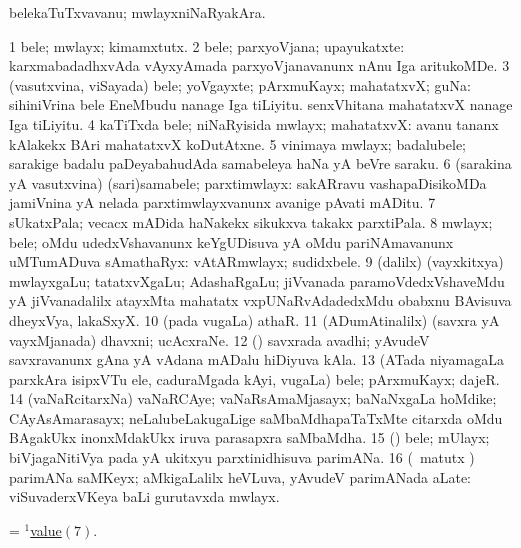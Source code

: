 \bentry
{} 
\gl{\nA}
\expl{}
\bmng
 belekaTuTxvavanu; mwlayxniNaRyakAra. 
\emng
\eentry

\bentry
{} 
\gl{\nA}
\expl{}
\bmng
\bnum
\num{1} bele; mwlayx; kimamxtutx. 
\num{2} bele; parxyoVjana; upayukatxte:  karxmabadadhxvAda vAyxyAmada parxyoVjanavanunx nAnu Iga aritukoMDe. 
\num{3} (vasutxvina, viSayada) bele; yoVgayxte; pArxmuKayx; mahatatxvX; guNa:  sihiniVrina bele EneMbudu nanage Iga tiLiyitu.  senxVhitana mahatatxvX nanage Iga tiLiyitu. 
\num{4} kaTiTxda bele; niNaRyisida mwlayx; mahatatxvX:  avanu tananx kAlakekx BAri mahatatxvX koDutAtxne. 
\num{5} vinimaya mwlayx; badalubele; sarakige badalu paDeyabahudAda samabeleya haNa yA beVre saraku. 
\num{6} (sarakina yA vasutxvina) (sari)samabele; parxtimwlayx:  sakARravu vashapaDisikoMDa jamiVnina yA nelada parxtimwlayxvanunx avanige pAvati mADitu. 
\hypertarget{value(1)7}{} 
\num{7} sUkatxPala; vecacx mADida haNakekx sikukxva takakx parxtiPala. 
\num{8} mwlayx; bele; oMdu udedxVshavanunx keYgUDisuva yA oMdu pariNAmavanunx uMTumADuva sAmathaRyx:  vAtARmwlayx; sudidxbele. 
\num{9} (\bava dalilx) (vayxkitxya) mwlayxgaLu; tatatxvXgaLu; AdashaRgaLu; jiVvanada paramoVdedxVshaveMdu yA jiVvanadalilx atayxMta mahatatx vxpUNaRvAdadedxMdu obabxnu BAvisuva dheyxVya, lakaSxyX. 
\num{10} (pada \mo vugaLa) athaR. 
\num{11} (ADumAtinalilx) (savxra yA vayxMjanada) dhavxni; ucAcxraNe. 
\num{12} (\saM) savxrada avadhi; yAvudeV savxravanunx gAna yA vAdana mADalu hiDiyuva kAla. 
\num{13} (ATada niyamagaLa parxkAra isipxVTu ele, caduraMgada kAyi, \mo vugaLa) bele; pArxmuKayx; dajeR. 
\num{14} (vaNaRcitarxNa) vaNaRCAye; vaNaRsAmaMjasayx; baNaNxgaLa hoMdike; CAyAsAmarasayx; neLalubeLakugaLige saMbaMdhapaTaTxMte citarxda oMdu BAgakUkx inonxMdakUkx iruva parasapxra saMbaMdha. 
\num{15} (\ga) bele; mUlayx; biVjagaNitiVya pada yA ukitxyu parxtinidhisuva parimANa. 
\num{16} (\Bwvi\ matutx \ravi) parimANa saMKeyx; aMkigaLalilx heVLuva, yAvudeV parimANada aLate:  viSuvaderxVKeya baLi gurutavxda mwlayx. 
\enum
\emng

\noindent
\gl{\pagu}
\expl{}
\bmng
  = \hyperlink{value(1)7}{$^1$value\((7)\)}. 
\emng
\eentry

